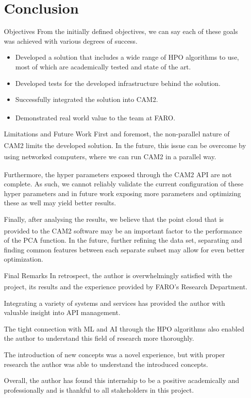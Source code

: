 \documentclass[10pt]{beamer}
\newcommand{\farons}[0]{FARO\textsuperscript{\textregistered}}
\begin{document}
  \section{Conclusion}
  \begin{frame}{Objectives}
    From the initially defined objectives, we can say each of these goals was achieved with various degrees of success. 
    \begin{itemize}
      \item Developed a solution that includes a wide range of HPO algorithms to use, most of which are academically tested and state of the art.
      \item Developed tests for the developed infrastructure behind the solution.
      \item Successfully integrated the solution into CAM2.
      \item Demonstrated real world value to the team at \farons.
    \end{itemize}
  \end{frame}
  \begin{frame}{Limitations and Future Work}
    First and foremost, the non-parallel nature of CAM2\textsuperscript{\textregistered} limits the developed solution. In the future, this issue can be overcome by using networked computers, where we can run CAM2\textsuperscript{\textregistered} in a parallel way.

    Furthermore, the hyper parameters exposed through the CAM2\textsuperscript{\textregistered} API are not complete. As such, we cannot reliably validate the current configuration of these hyper parameters and in future work exposing more parameters and optimizing these as well may yield better results.

    Finally, after analysing the results, we believe that the point cloud that is provided to the CAM2\textsuperscript{\textregistered} software may be an important factor to the performance of the PCA function. In the future, further refining the data set, separating and finding common features between each separate subset may allow for even better optimization.
  \end{frame}
  \begin{frame}{Final Remarks}
    In retrospect, the author is overwhelmingly satisfied with the project, its results and the experience provided by \farons 's Research Department.

    Integrating a variety of systems and services has provided the author with valuable insight into API management. 

    The tight connection with ML and AI through the HPO algorithms also enabled the author to understand this field of research more thoroughly.

    The introduction of new concepts was a novel experience, but with proper research the author was able to understand the introduced concepts.

    Overall, the author has found this internship to be a positive academically and professionally and is thankful to all stakeholders in this project.
  \end{frame}
\end{document}
